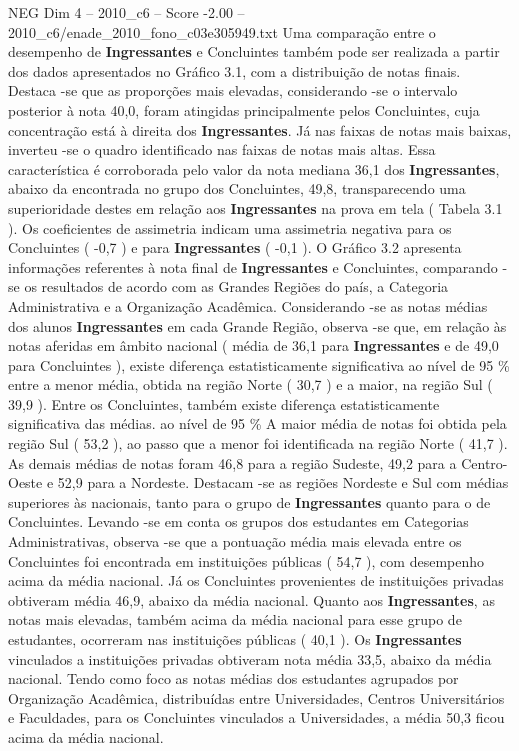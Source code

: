 \begin{textsample}{NEG Dim 4 – 2010\_c6 – Score -2.00 – 2010\_c6/enade\_2010\_fono\_c03e305949.txt}
Uma comparação entre o desempenho de \textbf{Ingressantes} e Concluintes também pode ser realizada a partir dos dados apresentados no Gráfico 3.1, com a distribuição de notas finais.
Destaca -se que as proporções mais elevadas, considerando -se o intervalo posterior à nota 40,0, foram atingidas principalmente pelos Concluintes, cuja concentração está à direita dos \textbf{Ingressantes}.
Já nas faixas de notas mais baixas, inverteu -se o quadro identificado nas faixas de notas mais altas.
Essa característica é corroborada pelo valor da nota mediana 36,1 dos \textbf{Ingressantes}, abaixo da encontrada no grupo dos Concluintes, 49,8, transparecendo uma superioridade destes em relação aos \textbf{Ingressantes} na prova em tela ( Tabela 3.1 ).
Os coeficientes de assimetria indicam uma assimetria negativa para os Concluintes ( -0,7 ) e para \textbf{Ingressantes} ( -0,1 ).
O Gráfico 3.2 apresenta informações referentes à nota final de \textbf{Ingressantes} e Concluintes, comparando -se os resultados de acordo com as Grandes Regiões do país, a Categoria Administrativa e a Organização Acadêmica.
Considerando -se as notas médias dos alunos \textbf{Ingressantes} em cada Grande Região, observa -se que, em relação às notas aferidas em âmbito nacional ( média de 36,1 para \textbf{Ingressantes} e de 49,0 para Concluintes ), existe diferença estatisticamente significativa ao nível de 95 \% entre a menor média, obtida na região Norte ( 30,7 ) e a maior, na região Sul ( 39,9 ).
Entre os Concluintes, também existe diferença estatisticamente significativa das médias. ao nível de 95 \% A maior média de notas foi obtida pela região Sul ( 53,2 ), ao passo que a menor foi identificada na região Norte ( 41,7 ).
As demais médias de notas foram 46,8 para a região Sudeste, 49,2 para a Centro-Oeste e 52,9 para a Nordeste.
Destacam -se as regiões Nordeste e Sul com médias superiores às nacionais, tanto para o grupo de \textbf{Ingressantes} quanto para o de Concluintes.
Levando -se em conta os grupos dos estudantes em Categorias Administrativas, observa -se que a pontuação média mais elevada entre os Concluintes foi encontrada em instituições públicas ( 54,7 ), com desempenho acima da média nacional.
Já os Concluintes provenientes de instituições privadas obtiveram média 46,9, abaixo da média nacional.
Quanto aos \textbf{Ingressantes}, as notas mais elevadas, também acima da média nacional para esse grupo de estudantes, ocorreram nas instituições públicas ( 40,1 ).
Os \textbf{Ingressantes} vinculados a instituições privadas obtiveram nota média 33,5, abaixo da média nacional.
Tendo como foco as notas médias dos estudantes agrupados por Organização Acadêmica, distribuídas entre Universidades, Centros Universitários e Faculdades, para os Concluintes vinculados a Universidades, a média 50,3 ficou acima da média nacional.

\end{textsample}
